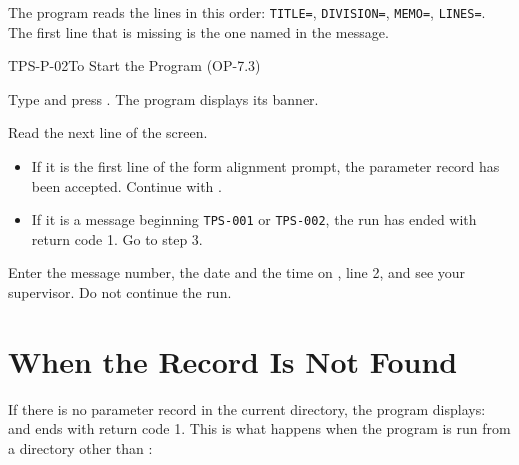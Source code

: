 The program reads the lines in this order: \texttt{TITLE=},
\texttt{DIVISION=}, \texttt{MEMO=}, \texttt{LINES=}.  The first line that is
missing is the one named in the message.

\begin{Procedure}{TPS-P-02}{To Start the Program (OP-7.3)}
\begin{ProcSteps}
\item Type  and press .  The program
  displays its banner.
\item Read the next line of the screen.
  \begin{itemize}
  \item If it is the first line of the form alignment prompt, the parameter
    record has been accepted.  Continue with .
  \item If it is a message beginning \texttt{TPS-001} or \texttt{TPS-002},
    the run has ended with return code 1.  Go to step 3.
  \end{itemize}
\item Enter the message number, the date and the time on , line 2,
  and see your supervisor.  Do not continue the run.
\end{ProcSteps}
\end{Procedure}

\section{When the Record Is Not Found}
If there is no parameter record in the current directory, the program
displays:
and ends with return code 1.  This is what happens when the program is run
from a directory other than :


